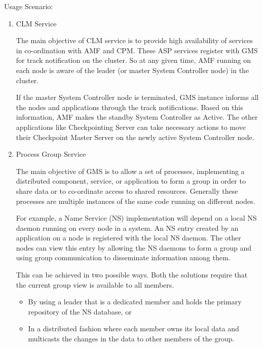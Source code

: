 \begin{flushleft}
\begin{Desc}
\item[Usage Scenario:]
\begin{enumerate}
\item \begin{bf}CLM Service \end{bf}
\newline
The main objective of CLM service is to provide high availability of
services in co-ordination with AMF and CPM. These ASP services
register with GMS for track notification on the cluster. So at any
given time, AMF running on each node is aware of the leader (or
master System Controller node) in the cluster.
\newline
\par
If the master System Controller node is terminated, GMS instance
informs all the nodes and applications through the track
notifications. Based on this information, AMF makes the standby
System Controller as Active. The other applications like
Checkpointing Server can take necessary actions to move their
Checkpoint Master Server on the newly active System Controller node.

\item \begin{bf}Process Group Service \end{bf}
\newline
The main objective of GMS is to allow a set of processes,
implementing a distributed component, service, or application to
form a group in order to share data or to co-ordinate access to
shared resources. Generally these processes are multiple instances
of the same code running on different nodes.
\newline
\par
For example, a Name Service (NS) implementation will depend on a
local NS daemon running on every node in a system. An NS entry
created by an application on a node is registered with the local NS
daemon. The other nodes can view this entry by allowing the NS
daemons to form a group and using group communication to disseminate
information among them.
\newline
\par
This can be achieved in two possible ways. Both the solutions
require that the current group view is available to all members.
\begin{itemize}
\item By using a leader that is a dedicated member and holds the primary repository of the NS database, or
\item In a distributed fashion where each member owns its local data and multicasts the changes in the data to other members of the group.
\end{itemize}
\end{enumerate}
\end{Desc}


\end{flushleft}
